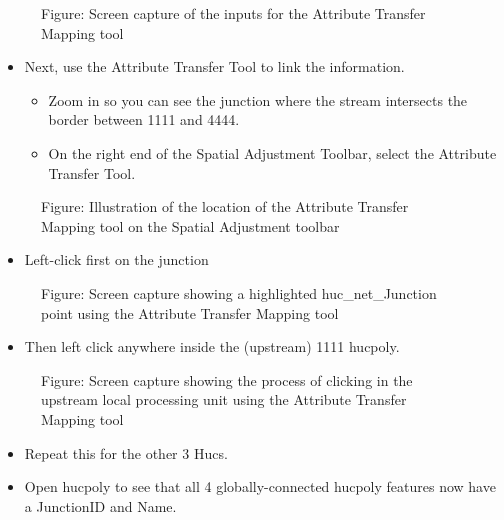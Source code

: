 \documentclass[letterpaper,10pt,english]{sphinxmanual}
\begin{document}
\begin{figure}[htbp]
\centering
\capstart

\noindent{}
\caption{Figure: Screen capture of the inputs for the Attribute Transfer Mapping tool}\label{\detokenize{ex_2:id34}}\end{figure}
\begin{itemize}
\item {} 
Next, use the Attribute Transfer Tool to link the information.
\begin{itemize}
\item {} 
Zoom in so you can see the junction where the stream intersects the border between 1111 and 4444.

\item {} 
On the right end of the Spatial Adjustment Toolbar, select the Attribute Transfer Tool.

\end{itemize}

\end{itemize}

\begin{figure}[htbp]
\centering
\capstart

\noindent{}
\caption{Figure: Illustration of the location of the Attribute Transfer Mapping tool on the Spatial Adjustment toolbar}\label{\detokenize{ex_2:id35}}\end{figure}
\begin{itemize}
\item {} 
Left-click first on the junction

\end{itemize}

\begin{figure}[htbp]
\centering
\capstart

\noindent{}
\caption{Figure: Screen capture showing a highlighted huc\_net\_Junction point using the Attribute Transfer Mapping tool}\label{\detokenize{ex_2:id36}}\end{figure}
\begin{itemize}
\item {} 
Then left click anywhere inside the (upstream) 1111 hucpoly.

\end{itemize}

\begin{figure}[htbp]
\centering
\capstart

\noindent{}
\caption{Figure: Screen capture showing the process of clicking in the upstream local processing unit using the Attribute Transfer Mapping tool}\label{\detokenize{ex_2:id37}}\end{figure}
\begin{itemize}
\item {} 
Repeat this for the other 3 Hucs.

\item {} 
Open hucpoly to see that all 4 globally-connected hucpoly features now have a JunctionID and Name.

\end{itemize}
\end{document}
